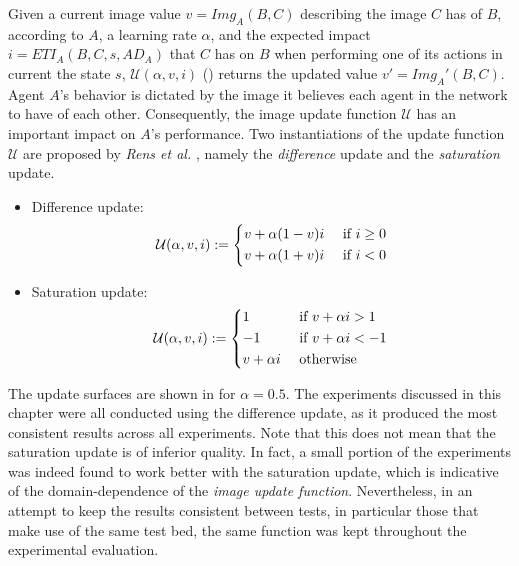 Given a current image value $v = Img_A(B,C)$ describing the image $C$ has of $B$, according to $A$, a learning rate $\alpha$, and the expected impact $i = ETI_A(B,C,s,AD_A)$ that $C$ has on $B$ when performing one of its actions in current the state $s$, $\mathcal{U}(\alpha, v, i)$ () returns the updated value $v' = Img_A'(B,C)$. Agent $A$'s behavior is dictated by the image it believes each agent in the network to have of each other. Consequently, the image update function $\mathcal{U}$ has an important impact on $A$'s performance.
Two instantiations of the update function $\mathcal{U}$ are proposed by \textit{Rens et al.} \cite{rensetal}, namely the \textit{difference} update and the \textit{saturation} update.  

\begin{itemize}
    \item Difference update: 
    \begin{align}
    \mathcal{U}(\alpha, v, i) :=
        \begin{dcases}
            v + \alpha (1-v)i &\text{ if } i \geq 0
            \\
            v + \alpha (1+v)i &\text{ if } i < 0
        \end{dcases}
    \end{align}
    
    \item Saturation update: 
    \begin{align}
    \mathcal{U}(\alpha, v, i) :=
        \begin{dcases}
            1 &\text{ if } v + \alpha i > 1
            \\
            -1 &\text{ if } v + \alpha i < -1
            \\
            v + \alpha i &\text{ otherwise }
        \end{dcases}
    \end{align}
\end{itemize}

The update surfaces are shown in  for $\alpha = 0.5$. The experiments discussed in this chapter were all conducted using the difference update, as it produced the most consistent results across all experiments. Note that this does not mean that the saturation update is of inferior quality. In fact, a small portion of the experiments was indeed found to work better with the saturation update, which is indicative of the domain-dependence of the \textit{image update function}. Nevertheless, in an attempt to keep the results consistent between tests, in particular those that make use of the same test bed, the same function was kept throughout the experimental evaluation.


